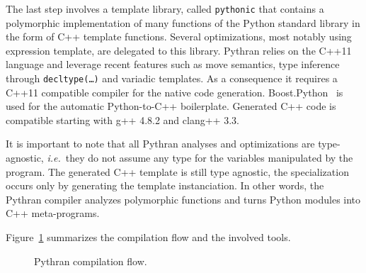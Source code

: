 \documentclass[10pt, onecolumn, preprint]{sigplanconf}
\providecommand{\ie}[1][~]{\textit{i.e.}#1}
\begin{document}
The last step involves a template library, called \texttt{pythonic} that 
contains a polymorphic implementation of many functions of the Python standard
library in the form of C++ template functions. Several optimizations, most
notably using expression template, are delegated to this library. Pythran relies
on the C++11~\cite{isocxx11} language and leverage recent features such as
move semantics, type inference through \texttt{decltype(\dots)} and variadic
templates.
As a consequence it requires a C++11 compatible compiler for the native code
generation. Boost.Python~\cite{boostpython2007} is used for the automatic
Python-to-C++ boilerplate. Generated C++ code is compatible starting with g++ 
4.8.2 and clang++ 3.3.

It is important to note that all Pythran analyses and optimizations are
type-agnostic, \ie{they do not assume any type for the variables manipulated
by the program}. The generated C++ template is still type agnostic, the specialization occurs only by generating the template instanciation.
In other words, the Pythran compiler analyzes polymorphic functions and turns
Python modules into C++ meta-programs.

Figure~\ref{fig:pythran-compiler} summarizes the compilation flow and the 
involved tools.

\begin{figure}

    \centering
    
    \caption{Pythran compilation flow.}
    \label{fig:pythran-compiler}

\end{figure}
\end{document}
